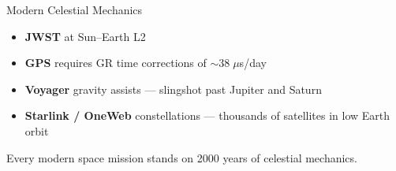 \documentclass[aspectratio=169, 14pt]{beamer}
\begin{document}

\begin{frame}{Modern Celestial Mechanics}
  \begin{itemize}
    \item \textbf{JWST} at Sun--Earth L2
    \item \textbf{GPS} requires GR time corrections of ${\sim}38\;\mu$s/day
    \item \textbf{Voyager} gravity assists --- slingshot past Jupiter and Saturn
    \item \textbf{Starlink / OneWeb} constellations ---
          thousands of satellites in low Earth orbit
  \end{itemize}
  \vspace{10pt}
  \begin{center}
    {\color{accent} Every modern space mission stands on 2000 years of celestial mechanics.}
  \end{center}
\end{frame}
\end{document}

